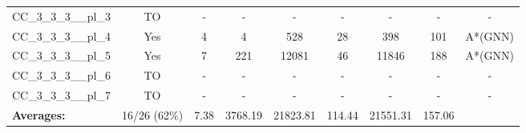 \documentclass{article}
\begin{document}
\begin{tabular}{lcccccccc}
CC\_3\_3\_3\_\_pl\_3 & TO & - & - & - & - & - & - & - \\
CC\_3\_3\_3\_\_pl\_4 & Yes & 4 & 4 & 528 & 28 & 398 & 101 & A*(GNN) \\
CC\_3\_3\_3\_\_pl\_5 & Yes & 7 & 221 & 12081 & 46 & 11846 & 188 & A*(GNN) \\
CC\_3\_3\_3\_\_pl\_6 & TO & - & - & - & - & - & - & - \\
CC\_3\_3\_3\_\_pl\_7 & TO & - & - & - & - & - & - & - \\
\textbf{Averages:} & 16/26 (62\%) & 7.38 & 3768.19 & 21823.81 & 114.44 & 21551.31 & 157.06 & \\
\bottomrule
\end{tabular}
\\[0.7cm]
\end{document}

